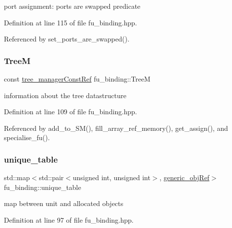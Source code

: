 port assignment\+: ports are swapped predicate 



Definition at line 115 of file fu\+\_\+binding.\+hpp.



Referenced by set\+\_\+ports\+\_\+are\+\_\+swapped().

\mbox{\label{classfu__binding_a4de9ee3ee6567c737372884783011a2e}} 
\subsubsection{\texorpdfstring{TreeM}{TreeM}}
{\footnotesize\ttfamily const \hyperlink{tree__manager_8hpp_a792e3f1f892d7d997a8d8a4a12e39346}{tree\+\_\+manager\+Const\+Ref} fu\+\_\+binding\+::\+TreeM\hspace{0.3cm}{\ttfamily [protected]}}



information about the tree datastructure 



Definition at line 109 of file fu\+\_\+binding.\+hpp.



Referenced by add\+\_\+to\+\_\+\+S\+M(), fill\+\_\+array\+\_\+ref\+\_\+memory(), get\+\_\+assign(), and specialise\+\_\+fu().

\mbox{\label{classfu__binding_a8a59858eeaefa8845d4a163dd9bdbdcc}} 
\subsubsection{\texorpdfstring{unique\+\_\+table}{unique\_table}}
{\footnotesize\ttfamily std\+::map$<$std\+::pair$<$unsigned int, unsigned int$>$, \hyperlink{generic__obj_8hpp_acb533b2ef8e0fe72e09a04d20904ca81}{generic\+\_\+obj\+Ref}$>$ fu\+\_\+binding\+::unique\+\_\+table\hspace{0.3cm}{\ttfamily [protected]}}



map between unit and allocated objects 



Definition at line 97 of file fu\+\_\+binding.\+hpp.



